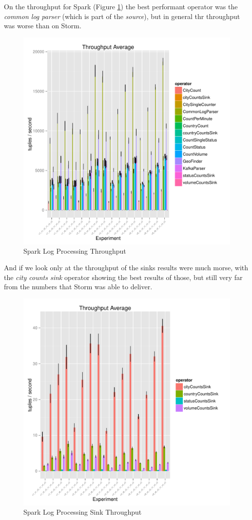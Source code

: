 \documentclass[ppgc,diss,english]{iiufrgs}
\begin{document}
On the throughput for Spark (Figure \ref{fig:spark_logprocessing_throughput}) the best performant operator was the \textit{common log parser} (which is part of the \textit{source}), but in general thr throughput was worse than on Storm.

\begin{figure}[H]
    \centering
	\includegraphics[width=.6\textwidth]{summaries/spark_logprocessing/throughput.pdf}
	\caption{Spark Log Processing Throughput}
	\label{fig:spark_logprocessing_throughput}
\end{figure}

And if we look only at the throughput of the sinks results were much morse, with the \textit{city counts sink} operator showing the best results of those, but still very far from the numbers that Storm was able to deliver.

\begin{figure}[H]
    \centering
	\includegraphics[width=.6\textwidth]{summaries/spark_logprocessing/sink_throughput.pdf}
	\caption{Spark Log Processing Sink Throughput}
	\label{fig:spark_logprocessing_sink_throughput}
\end{figure}
\end{document}

